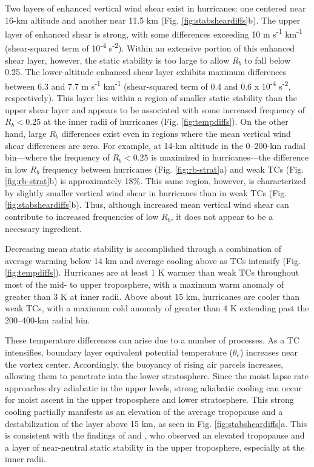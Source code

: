 Two layers of enhanced vertical wind shear exist in hurricanes: one centered near 16-km altitude and another near 11.5 km (Fig. \ref{fig:stabsheardiffs}b).
The upper layer of enhanced shear is strong, with some differences exceeding 10 m s\textsuperscript{-1} km\textsuperscript{-1} (shear-squared term of 10\textsuperscript{-4} s\textsuperscript{-2}).
Within an extensive portion of this enhanced shear layer, however, the static stability is too large to allow $R_b$ to fall below 0.25.
The lower-altitude enhanced shear layer exhibits maximum differences between 6.3 and 7.7 m s\textsuperscript{-1} km\textsuperscript{-1} (shear-squared term of 0.4 and 0.6 x 10\textsuperscript{-4} s\textsuperscript{-2}, respectively).
This layer lies within a region of smaller static stability than the upper shear layer and appears to be associated with some increased frequency of $R_b<0.25$ at the inner radii of hurricanes (Fig. \ref{fig:tempdiffs}).
On the other hand, large $R_b$ differences exist even in regions where the mean vertical wind shear differences are zero.
For example, at 14-km altitude in the 0–200-km radial bin---where the frequency of $R_b<0.25$ is maximized in hurricanes---the difference in low $R_b$ frequency between hurricanes (Fig. \ref{fig:rb-strat}a) and weak TCs (Fig. \ref{fig:rb-strat}b) is approximately 18\%.
This same region, however, is characterized by slightly smaller vertical wind shear in hurricanes than in weak TCs (Fig. \ref{fig:stabsheardiffs}b).
Thus, although increased mean vertical wind shear can contribute to increased frequencies of low $R_b$, it does not appear to be a necessary ingredient.

Decreasing mean static stability is accomplished through a combination of average warming below 14 km and average cooling above as TCs intensify (Fig. \ref{fig:tempdiffs}).
Hurricanes are at least 1 K warmer than weak TCs throughout most of the mid- to upper troposphere, with a maximum warm anomaly of greater than 3 K at inner radii.
Above about 15 km, hurricanes are cooler than weak TCs, with a maximum cold anomaly of greater than 4 K extending past the 200--400-km radial bin.

These temperature differences can arise due to a number of processes.
As a TC intensifies, boundary layer equivalent potential temperature ($\theta_e$) increases near the vortex center.
Accordingly, the buoyancy of rising air parcels increases, allowing them to penetrate into the lower stratosphere.
Since the moist lapse rate approaches dry adiabatic in the upper levels, strong adiabatic cooling can occur for moist ascent in the upper troposphere and lower stratosphere.
This strong cooling partially manifests as an elevation of the average tropopause and a destabilization of the layer above 15 km, as seen in Fig. \ref{fig:stabsheardiffs}a.
This is consistent with the findings of \cite{JordanJordan1954} and \cite{Koteswaram1967}, who observed an elevated tropopause and a layer of near-neutral static stability in the upper troposphere, especially at the inner radii.

